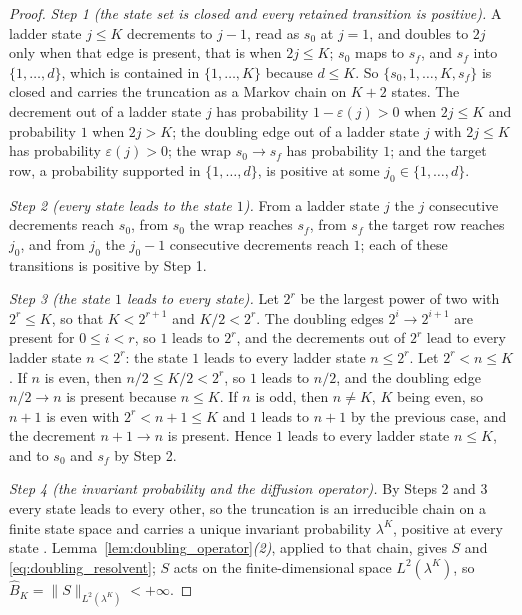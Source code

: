 \begin{proof}
\emph{Step 1 (the state set is closed and every retained transition is positive).} A ladder
state $j\leq K$ decrements to $j-1$, read as $s_0$ at $j=1$, and doubles to $2j$ only when that
edge is present, that is when $2j\leq K$; $s_0$ maps to $s_f$, and $s_f$ into $\{1,\dots,d\}$,
which is contained in $\{1,\dots,K\}$ because $d\leq K$. So $\{s_0,1,\dots,K,s_f\}$ is closed
and carries the truncation as a Markov chain on $K+2$ states. The decrement out of a ladder
state $j$ has probability $1-\varepsilon(j)>0$ when $2j\leq K$ and probability $1$ when
$2j>K$; the doubling edge out of a ladder state $j$ with $2j\leq K$ has probability
$\varepsilon(j)>0$; the wrap $s_0\rightarrow s_f$ has probability $1$; and the target row, a
probability supported in $\{1,\dots,d\}$, is positive at some $j_0\in\{1,\dots,d\}$.

\emph{Step 2 (every state leads to the state $1$).} From a ladder state $j$ the $j$ consecutive
decrements reach $s_0$, from $s_0$ the wrap reaches $s_f$, from $s_f$ the target row reaches
$j_0$, and from $j_0$ the $j_0-1$ consecutive decrements reach $1$; each of these transitions
is positive by Step 1.

\emph{Step 3 (the state $1$ leads to every state).} Let $2^r$ be the largest power of two with
$2^r\leq K$, so that $K<2^{r+1}$ and $K/2<2^r$. The doubling edges
$2^i\rightarrow2^{i+1}$ are present for $0\leq i<r$, so $1$ leads to $2^r$, and the decrements
out of $2^r$ lead to every ladder state $n<2^r$: the state $1$ leads to every ladder state
$n\leq2^r$. Let $2^r<n\leq K$. If $n$ is even, then $n/2\leq K/2<2^r$, so $1$ leads to $n/2$,
and the doubling edge $n/2\rightarrow n$ is present because $n\leq K$. If $n$ is odd, then
$n\neq K$, $K$ being even, so $n+1$ is even with $2^r<n+1\leq K$ and $1$ leads to $n+1$ by the
previous case, and the decrement $n+1\rightarrow n$ is present. Hence $1$ leads to every ladder
state $n\leq K$, and to $s_0$ and $s_f$ by Step 2.

\emph{Step 4 (the invariant probability and the diffusion operator).} By Steps 2 and 3 every
state leads to every other, so the truncation is an irreducible chain on a finite state space
and carries a unique invariant probability $\lambda^K$, positive at every state
\citep{levin2017markov}. Lemma~\ref{lem:doubling_operator}\emph{(2)}, applied to that chain,
gives $S$ and \eqref{eq:doubling_resolvent}; $S$ acts on the finite-dimensional space
$L^2(\lambda^K)$, so $\widehat B_K=\|S\|_{L^2(\lambda^K)}<+\infty$.
\end{proof}

